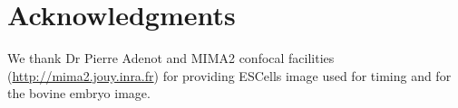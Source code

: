 \documentclass{InsightArticle}
\begin{document}
\section{Acknowledgments}
We thank Dr Pierre Adenot and MIMA2 confocal facilities
(\url{http://mima2.jouy.inra.fr}) for providing ESCells image used for
timing and for the bovine embryo image.


\appendix





\nocite{ITKSoftwareGuide}
\end{document}
